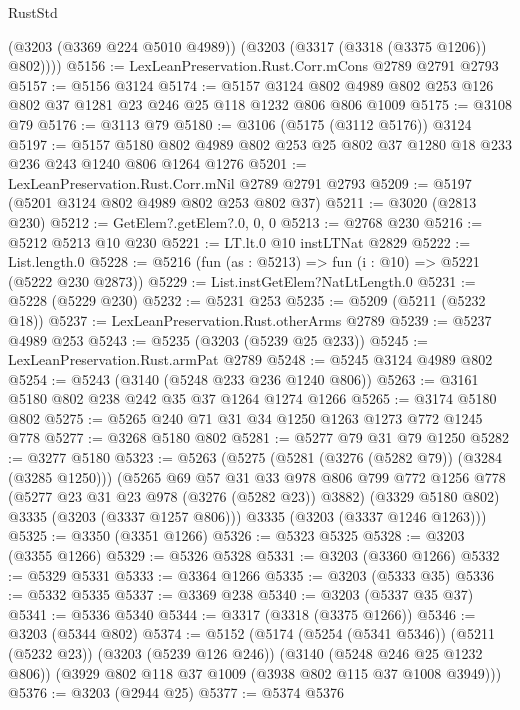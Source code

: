 \begin{lexlean}{RustStd}
\begin{coremodule}
{\begin{coremodule}
{{{{{{{{{{{{{{{        (@3203 (@3369 @224 @5010 @4989))
        (@3203 (@3317 (@3318 (@3375 @1206)) @802))))
@5156 := LexLeanPreservation.Rust.Corr.mCons @2789 @2791 @2793
@5157 := @5156 @3124
@5174 := @5157
    @3124
    @802
    @4989
    @802
    @253
    @126
    @802
    @37
    @1281
    @23
    @246
    @25
    @118
    @1232
    @806
    @806
    @1009
@5175 := @3108 @79
@5176 := @3113 @79
@5180 := @3106 (@5175 (@3112 @5176)) @3124
@5197 := @5157
    @5180
    @802
    @4989
    @802
    @253
    @25
    @802
    @37
    @1280
    @18
    @233
    @236
    @243
    @1240
    @806
    @1264
    @1276
@5201 := LexLeanPreservation.Rust.Corr.mNil @2789 @2791 @2793
@5209 := @5197 (@5201 @3124 @802 @4989 @802 @253 @802 @37)
@5211 := @3020 (@2813 @230)
@5212 := GetElem?.getElem?.{0, 0, 0}
@5213 := @2768 @230
@5216 := @5212 @5213 @10 @230
@5221 := LT.lt.{0} @10 instLTNat @2829
@5222 := List.length.{0}
@5228 := @5216 (fun (as : @5213) => fun (i : @10) => @5221 (@5222 @230 @2873))
@5229 := List.instGetElem?NatLtLength.{0}
@5231 := @5228 (@5229 @230)
@5232 := @5231 @253
@5235 := @5209 (@5211 (@5232 @18))
@5237 := LexLeanPreservation.Rust.otherArms @2789
@5239 := @5237 @4989 @253
@5243 := @5235 (@3203 (@5239 @25 @233))
@5245 := LexLeanPreservation.Rust.armPat @2789
@5248 := @5245 @3124 @4989 @802
@5254 := @5243 (@3140 (@5248 @233 @236 @1240 @806))
@5263 := @3161 @5180 @802 @238 @242 @35 @37 @1264 @1274 @1266
@5265 := @3174 @5180 @802
@5275 := @5265 @240 @71 @31 @34 @1250 @1263 @1273 @772 @1245 @778
@5277 := @3268 @5180 @802
@5281 := @5277 @79 @31 @79 @1250
@5282 := @3277 @5180
@5323 := @5263
    (@5275
      (@5281 (@3276 (@5282 @79)) (@3284 (@3285 @1250)))
      (@5265
        @69
        @57
        @31
        @33
        @978
        @806
        @799
        @772
        @1256
        @778
        (@5277 @23 @31 @23 @978 (@3276 (@5282 @23)) @3882)
        (@3329 @5180 @802)
        @3335
        (@3203 (@3337 @1257 @806)))
      @3335
      (@3203 (@3337 @1246 @1263)))
@5325 := @3350 (@3351 @1266)
@5326 := @5323 @5325
@5328 := @3203 (@3355 @1266)
@5329 := @5326 @5328
@5331 := @3203 (@3360 @1266)
@5332 := @5329 @5331
@5333 := @3364 @1266
@5335 := @3203 (@5333 @35)
@5336 := @5332 @5335
@5337 := @3369 @238
@5340 := @3203 (@5337 @35 @37)
@5341 := @5336 @5340
@5344 := @3317 (@3318 (@3375 @1266))
@5346 := @3203 (@5344 @802)
@5374 := @5152
    (@5174
      (@5254 (@5341 @5346))
      (@5211 (@5232 @23))
      (@3203 (@5239 @126 @246))
      (@3140 (@5248 @246 @25 @1232 @806))
      (@3929 @802 @118 @37 @1009 (@3938 @802 @115 @37 @1008 @3949)))
@5376 := @3203 (@2944 @25)
@5377 := @5374 @5376
}}}}}}}}}}}}}}}
\end{coremodule}}
\end{coremodule}
\end{lexlean}
